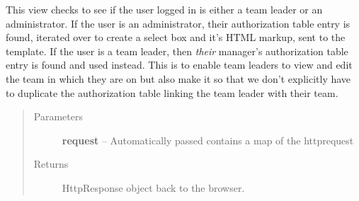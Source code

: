 \documentclass[letterpaper,10pt,english]{sphinxmanual}
\begin{document}
\begin{fulllineitems}
\label{code:timetracker.views.admin_view}
This view checks to see if the user logged in is either a team leader or
an administrator. If the user is an administrator, their authorization
table entry is found, iterated over to create a select box and it's HTML
markup, sent to the template. If the user is a team leader, then \emph{their}
manager's authorization table entry is found and used instead. This is to
enable team leaders to view and edit the team in which they are on but
also make it so that we don't explicitly have to duplicate the
authorization table linking the team leader with their team.
\begin{quote}\begin{description}
\item[{Parameters}] \leavevmode
\textbf{request} -- Automatically passed contains a map of the httprequest

\item[{Returns}] \leavevmode
HttpResponse object back to the browser.

\end{description}\end{quote}

\end{fulllineitems}

\end{document}

